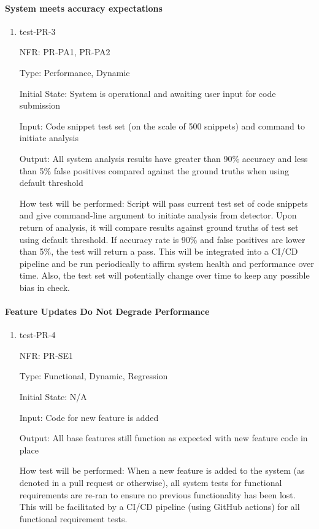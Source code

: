 \documentclass[12pt, titlepage]{article}
\begin{document}
\paragraph{System meets accuracy expectations}
\begin{enumerate}
  \item{test-PR-3}

  NFR: PR-PA1, PR-PA2

  Type: Performance, Dynamic
            
  Initial State: System is operational and awaiting user input for code submission
            
  Input: Code snippet test set (on the scale of 500 snippets) and command to initiate analysis
            
  Output: All system analysis results have greater than 90\% accuracy and less than 5\%
  false positives compared against the ground truths when using default threshold
            
  How test will be performed: 
  Script will pass current test set of code snippets and give command-line argument to 
  initiate analysis from detector. Upon return of analysis, it will compare results against 
  ground truths of test set using default threshold. If accuracy rate is 90\% and false positives 
  are lower than 5\%, the test will return a pass. This will be integrated into a CI/CD pipeline and 
  be run periodically to affirm system health and performance over time. Also, the test set will potentially
  change over time to keep any possible bias in check.
\end{enumerate}

\paragraph{Feature Updates Do Not Degrade Performance}
\begin{enumerate}
  \item{test-PR-4}

  NFR: PR-SE1

  Type: Functional, Dynamic, Regression
            
  Initial State: N/A
            
  Input: Code for new feature is added 
            
  Output: All base features still function as expected with new feature code in place
            
  How test will be performed: When a new feature is added to the system (as denoted in a 
  pull request or otherwise), all system tests for functional requirements
  are re-ran to ensure no previous functionality has been lost. This will be facilitated
  by a CI/CD pipeline (using GitHub actions) for all functional requirement tests.
\end{enumerate}
\end{document}
